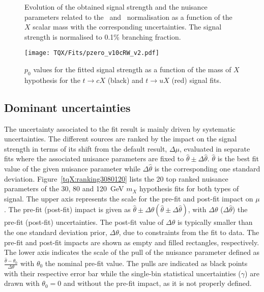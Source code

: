 \begin{figure}[htb]
    \RawFloats
    \centering
    \caption{Evolution of the obtained signal strength and the nuisance parameters related to the \ttb\ and \ttc\ normalisation as a function of the $X$ scalar mass with the corresponding uncertainties. The signal strength is normalised to 0.1\% branching fraction.
    }
    \label{tqX:fittedfactorsvsmass}
\end{figure}

\begin{figure}[htb]
    \RawFloats
    \centering
    \texttt{[image: TQX/Fits/pzero\_v10cRW\_v2.pdf]}
    \caption{$p_0$ values for the fitted signal strength as a function of the mass of $X$ hypothesis for the $t\to cX$ (black) and $t\to uX$ (red) signal fits.}
    \label{tqX:p0values}
\end{figure}

\subsection{Dominant uncertainties}

The uncertainty associated to the fit result is mainly driven by systematic uncertainties. The different sources are ranked by the impact on the signal strength in terms of its shift from the default result, $\Delta\mu$, evaluated in separate fits where the associated nuisance parameters are fixed to $\hat{\theta}\pm\Delta\hat{\theta}$. $\hat{\theta}$ is the best fit value of the given nuisance parameter while $\Delta\hat{\theta}$ is the corresponding one standard deviation. Figure~\ref{tqX:ranking3080120} lists the 20 top ranked nuisance parameters of the 30, 80 and 120~GeV $m_X$ hypothesis fits for both types of signal. The upper axis represents the scale for the pre-fit and post-fit impact on $\mu$. The pre-fit (post-fit) impact is given as $\hat{\theta} \pm \Delta\theta (\hat{\theta} \pm \Delta\hat{\theta})$, with $\Delta\theta$ ($\Delta\hat{\theta}$) the pre-fit (post-fit) uncertainties. The post-fit value of $\Delta\hat{\theta}$ is typically smaller than the one standard deviation prior, $\Delta\theta$, due to constraints from the fit to data. The pre-fit and post-fit impacts are shown as empty and filled rectangles, respectively. The lower axis indicates the scale of the pull of the nuisance parameter defined as $\frac{\hat{\theta} -\theta_0}{\Delta\theta}$ with $\theta_0$ the nominal pre-fit value. The pulls are indicated as black points with their respective error bar while the single-bin statistical uncertainties ($\gamma$) are drawn with $\theta_0=0$ and without the pre-fit impact, as it is not properly defined.

